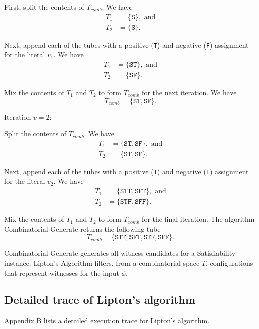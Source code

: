 First, split the contents of $T_{comb}$.  We have
\begin{align*}
 T_1 &= \{ \texttt{S} \}, \text{ and} \\
 T_2 &= \{ \texttt{S} \}.
\end{align*}

Next, append each of the tubes with a positive (\texttt{T}) and negative (\texttt{F}) assignment for the literal $v_1$.  We have
\begin{align*}
 T_1 &= \{ \texttt{ST} \}, \text{ and} \\
 T_2 &= \{ \texttt{SF} \}.
\end{align*}

Mix the contents of $T_1$ and $T_2$ to form $T_{comb}$ for the next iteration.  We have
\[
T_{comb} = \{\texttt{ST}, \texttt{SF}\}.
\]

\noindent Iteration $v = 2$:

Split the contents of $T_{comb}$.  We have
\begin{align*}
 T_1 &= \{\texttt{ST}, \texttt{SF}\}, \text{ and} \\
 T_2 &= \{\texttt{ST}, \texttt{SF}\}.
\end{align*}

Next, append each of the tubes with a positive (\texttt{T}) and negative (\texttt{F}) assignment for the literal $v_2$.  We have
\begin{align*}
 T_1 &= \{\texttt{STT}, \texttt{SFT}\}, \text{ and} \\
 T_2 &= \{\texttt{STF}, \texttt{SFF}\}.
\end{align*}

Mix the contents of $T_1$ and $T_2$ to form $T_{comb}$ for the final iteration.  The algorithm {\sc Combinatorial Generate} returns the following tube
\[
T_{comb} = \{\texttt{STT}, \texttt{SFT}, \texttt{STF}, \texttt{SFF}\}.
\]


{\sc Combinatorial Generate} generates all witness candidates for a {\sc Satisfiability} instance.  {\sc Lipton's Algorithm} filters, from a combinatorial space $T$, configurations that represent witnesses for the input $\phi$.

	\subsection{Detailed trace of Lipton's algorithm}	
Appendix B lists a detailed execution trace for Lipton's algorithm.

